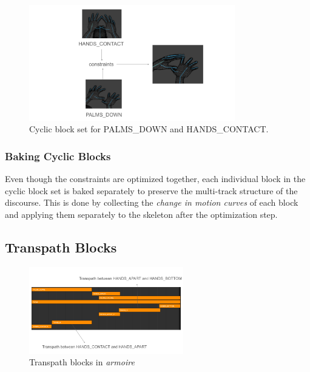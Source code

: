 \documentclass[../../main.tex]{subfiles}
\begin{document}
\begin{figure}[h]
    \centering
    \includegraphics[width=0.8\textwidth]{chapters/multi_track/images/cyclic_blocks.png}
    \caption{Cyclic block set for PALMS\_DOWN and HANDS\_CONTACT.}
    \label{fig:cyclic_blocks}
\end{figure}

\subsubsection{Baking Cyclic Blocks}
\label{ch:multi_track:second_pass:cyclic_blocks:baking_cyclic_blocks}

Even though the constraints are optimized together, each individual block in the cyclic block set is baked separately to preserve the multi-track structure of the discourse. This is done by collecting the \emph{change in motion curves} of each block and applying them separately to the skeleton after the optimization step.

\subsection{Transpath Blocks}
\label{ch:multi_track:second_pass:transpath_blocks}

\begin{figure}[h]
    \centering
    \includegraphics[width=0.6\textwidth]{chapters/multi_track/images/transpath_blocks.png}
    \caption{Transpath blocks in \emph{armoire}}
    \label{fig:transpath_blocks}
\end{figure}
\end{document}
